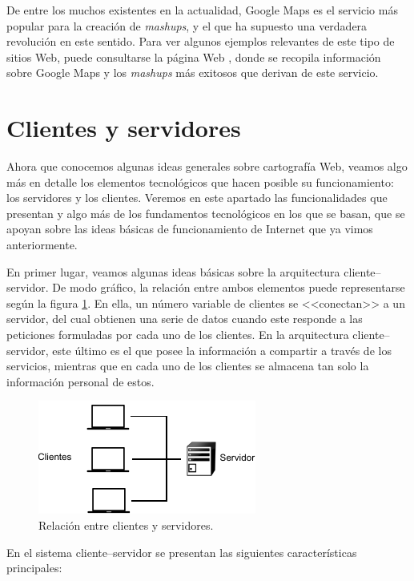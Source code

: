 De entre los muchos existentes en la actualidad, Google Maps \cite{webGoogleMaps} es el servicio más popular para la creación de \emph{mashups}, y el que ha supuesto una verdadera revolución en este sentido. Para ver algunos ejemplos relevantes de este tipo de sitios Web, puede consultarse la página Web \cite{webGoogleMapsCaseStudies}, donde se recopila información sobre Google Maps y los \emph{mashups} más exitosos que derivan de este servicio.


\section{Clientes y servidores}

Ahora que conocemos algunas ideas generales sobre cartografía Web, veamos algo más en detalle los elementos tecnológicos que hacen posible su funcionamiento: los servidores y los clientes. Veremos en este apartado las funcionalidades que presentan y algo más de los fundamentos tecnológicos en los que se basan, que se apoyan sobre las ideas básicas de funcionamiento de Internet que ya vimos anteriormente.

En primer lugar, veamos algunas ideas básicas sobre la arquitectura cliente--servidor. De modo gráfico, la relación entre ambos elementos puede representarse según la figura \ref{Fig:Servidores_y_clientes}. En ella, un número variable de clientes se <<conectan>> a un servidor, del cual obtienen una serie de datos cuando este responde a las peticiones formuladas por cada uno de los clientes. En la arquitectura cliente--servidor, este último es el que posee la información a compartir a través de los servicios, mientras que en cada uno de los clientes se almacena tan solo la información personal de estos.

\begin{figure}[!hbt]   
\centering
\includegraphics[width=0.75\mycolumnwidth]{Cliente_servidor/Servidores_y_clientes.pdf}
\caption{\small Relación entre clientes y servidores.}
\label{Fig:Servidores_y_clientes} 
\end{figure}

En el sistema cliente--servidor se presentan las siguientes características principales:


